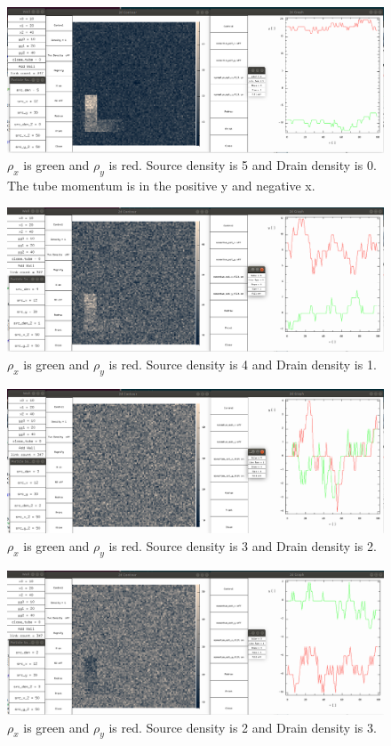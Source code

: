 \documentclass{article}
\begin{document}
\begin{figure}[H]
\centering
\includegraphics[scale=0.25]{source_5_drain_0.png}
\caption{\label{fig} $\rho_x$ is green and $\rho_y$ is red. Source density is 5 and Drain density is 0. The tube momentum is in the positive y and negative x.}
\end{figure}

\begin{figure}[H]
\centering
\includegraphics[scale=0.25]{source_4_drain_1.png}
\caption{\label{fig} $\rho_x$ is green and $\rho_y$ is red. Source density is 4 and Drain density is 1.}
\end{figure}

\begin{figure}[H]
\centering
\includegraphics[scale=0.25]{source_3_drain_2.png}
\caption{\label{fig} $\rho_x$ is green and $\rho_y$ is red. Source density is 3 and Drain density is 2.}
\end{figure}

\begin{figure}[H]
\centering
\includegraphics[scale=0.25]{source_2_drain_3.png}
\caption{\label{fig} $\rho_x$ is green and $\rho_y$ is red. Source density is 2 and Drain density is 3.}
\end{figure}
\end{document}
